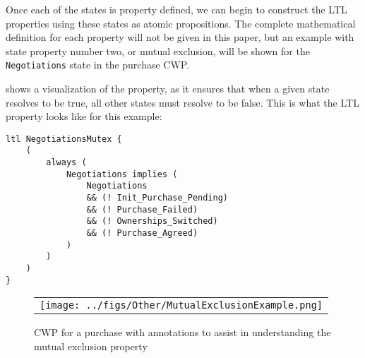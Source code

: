 Once each of the states is property defined, we can begin to construct the LTL properties using these states as atomic propositions. The complete mathematical definition for each property will not be given in this paper, but an example with state property number two, or mutual exclusion, will be shown for the \lstinline[style=myPromela]{Negotiations} state in the purchase CWP.

 shows a visualization of the property, as it ensures that when a given state resolves to be true, all other states must resolve to be false. This is what the LTL property looks like for this example:

\begin{lstlisting}[style=myPromela]
ltl NegotiationsMutex {
    (
        always (
            Negotiations implies (
                Negotiations
                && (! Init_Purchase_Pending)
                && (! Purchase_Failed)
                && (! Ownerships_Switched)
                && (! Purchase_Agreed)
            )
        )
    )
}
\end{lstlisting}

\begin{figure*}[t]
  \begin{center}
    \begin{tabular}{c}
        \texttt{[image: ../figs/Other/MutualExclusionExample.png]}
    \end{tabular}
  \end{center}
\caption{CWP for a purchase with annotations to assist in understanding the mutual exclusion property}
\label{fig:MutualExclusionExample}
\end{figure*}
